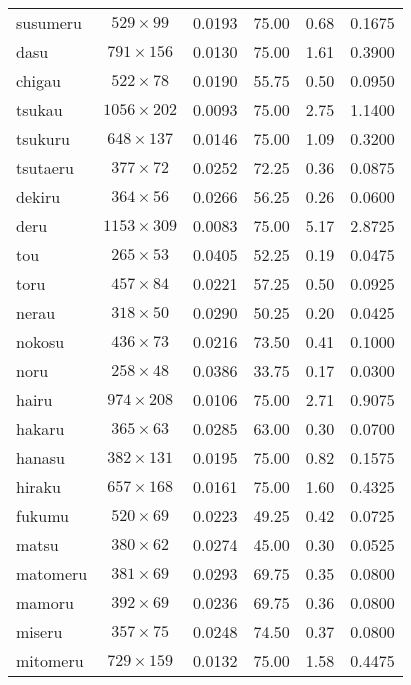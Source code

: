 \begin{table}[ht]
\begin{center}
\begin{tabular}{|p{}|c|c|c|c|c|}
susumeru & \( 529 \times 99 \) & 0.0193  & 75.00 & 0.68   & 0.1675   \\
dasu & \( 791 \times 156 \) & 0.0130     & 75.00 & 1.61   & 0.3900   \\
chigau & \( 522 \times 78 \) & 0.0190    & 55.75 & 0.50   & 0.0950   \\
tsukau & \( 1056 \times 202 \) & 0.0093  & 75.00 & 2.75   & 1.1400   \\
tsukuru & \( 648 \times 137 \) & 0.0146  & 75.00 & 1.09   & 0.3200  \\
tsutaeru & \( 377 \times 72 \) & 0.0252  & 72.25 & 0.36   & 0.0875      \\
dekiru & \( 364 \times 56 \) & 0.0266    & 56.25 & 0.26   & 0.0600        \\
deru & \( 1153 \times 309 \) & 0.0083    & 75.00 & 5.17   & 2.8725          \\
tou & \( 265 \times 53 \) & 0.0405       & 52.25 & 0.19   & 0.0475           \\
toru & \( 457 \times 84 \) & 0.0221      & 57.25 & 0.50   & 0.0925          \\
nerau & \( 318 \times 50 \) & 0.0290     & 50.25 & 0.20   & 0.0425         \\
nokosu & \( 436 \times 73 \) & 0.0216    & 73.50 & 0.41   & 0.1000        \\
noru & \( 258 \times 48 \) & 0.0386      & 33.75 & 0.17   & 0.0300          \\
hairu & \( 974 \times 208 \) & 0.0106    & 75.00 & 2.71   & 0.9075         \\
hakaru & \( 365 \times 63 \) & 0.0285    & 63.00 & 0.30   & 0.0700        \\
hanasu & \( 382 \times 131 \) & 0.0195   & 75.00 & 0.82   & 0.1575        \\
hiraku & \( 657 \times 168 \) & 0.0161   & 75.00 & 1.60   & 0.4325        \\
fukumu & \( 520 \times 69 \) & 0.0223    & 49.25 & 0.42   & 0.0725        \\
matsu & \( 380 \times 62 \) & 0.0274     & 45.00 & 0.30   & 0.0525         \\
matomeru & \( 381 \times 69 \) & 0.0293  & 69.75 & 0.35   & 0.0800      \\
mamoru & \( 392 \times 69 \) & 0.0236    & 69.75 & 0.36   & 0.0800        \\
miseru & \( 357 \times 75 \) & 0.0248    & 74.50 & 0.37   & 0.0800        \\
mitomeru & \( 729 \times 159 \) & 0.0132 & 75.00 & 1.58   & 0.4475      \\

\end{tabular}
\end{center}
\end{table}
